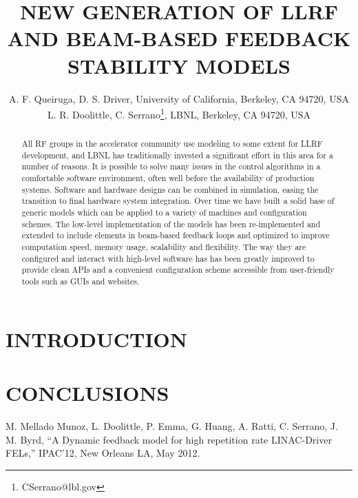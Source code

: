 \documentclass[acus]{JAC2003}
\begin{document}
\title{NEW GENERATION OF LLRF AND BEAM-BASED FEEDBACK STABILITY MODELS}

\author{A. F. Queiruga, D. S. Driver, University of California, Berkeley, CA 94720, USA\\
L. R. Doolittle, C. Serrano\thanks{CSerrano@lbl.gov}, LBNL, Berkeley, CA 94720, USA}

\maketitle

\begin{abstract}
    All RF groups in the accelerator community use modeling to some extent for LLRF development, and LBNL has
traditionally invested a significant effort in this area for a number of reasons. It is possible to solve many
issues in the control algorithms in a comfortable software environment, often well before the availability of production
systems. Software and hardware designs can be combined in simulation, easing the transition to final hardware system
integration.  Over time we have built a solid base of generic models which can be applied to a variety of machines and
configuration schemes. The low-level implementation of the models has been re-implemented and extended to include
elements in beam-based feedback loops and optimized to improve computation speed, memory usage, scalability and
flexibility. The way they are configured and interact with high-level software has has been greatly improved to provide clean APIs
and a convenient configuration scheme accessible from user-friendly tools such as GUIs and websites.
\end{abstract}

\section{INTRODUCTION}


\section{CONCLUSIONS}

\begin{thebibliography}{9}   %

M. Mellado Munoz, L. Doolittle, P. Emma, G. Huang, A. Ratti, C. Serrano, J. M. Byrd, ``A Dynamic feedback model for high repetition rate LINAC-Driver FELs,''
IPAC'12, New Orleans LA, May 2012.


\end{thebibliography}
\end{document}
